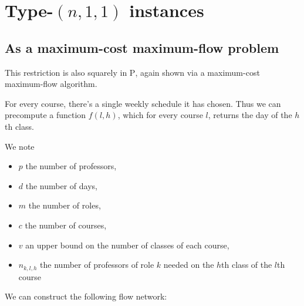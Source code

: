 \section{Type-$(n, 1, 1)$ instances}

\subsection{As a maximum-cost maximum-flow problem}
This restriction is also squarely in \textsc{P}, again shown via a maximum-cost maximum-flow algorithm.

For every course, there's a single weekly schedule it has chosen. Thus we can precompute a function $f(l, h)$, which for every course $l$, returns the day of the $h$th class.

We note
\begin{itemize}
  \item $p$ the number of professors,
  \item $d$ the number of days,
  \item $m$ the number of roles,
  \item $c$ the number of courses,
  \item $v$ an upper bound on the number of classes of each course,
  \item $n_{k, l, h}$ the number of professors of role $k$ needed on the $h$th class of the $l$th course
\end{itemize}

We can construct the following flow network:

